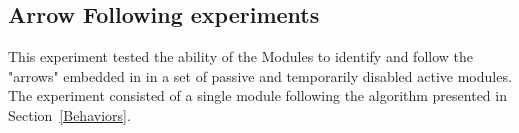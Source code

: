 \subsection{Arrow Following experiments}
\label{sec:mblocksExperimentsArrow}
This experiment tested the ability of the Modules to identify and follow the "arrows" embedded in in a set of passive and temporarily disabled active modules. The experiment consisted of a single module following the algorithm presented in Section~\ref{Behaviors}.


